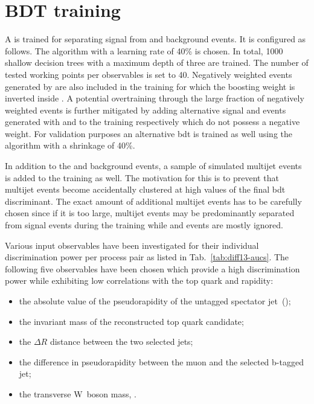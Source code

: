 \section{BDT training}
\label{sec:diff13-bdt}

A \bdt is trained for separating signal from \wjets and \ttbar background events. It is configured as follows. The \ADABOOST algorithm with a learning rate of 40\% is chosen. In total, 1000 shallow decision trees with a maximum depth of three are trained. The number of tested working points per observables is set to 40. Negatively weighted events generated by \MGAMC are also included in the training for which the boosting weight is inverted inside \TMVA. A potential overtraining through the large fraction of negatively weighted events is further mitigated by adding alternative signal and \wjets events generated with \POWHEG and \MG to the training respectively which do not possess a negative weight. For validation purposes an alternative \gls{bdt} is trained as well using the \GRADIENTBOOST algorithm with a shrinkage of 40\%.

In addition to the \wjets and \ttbar background events, a sample of simulated multijet events is added to the training as well. The motivation for this is to prevent that multijet events become accidentally clustered at high values of the final \gls{bdt} discriminant. The exact amount of additional multijet events has to be carefully chosen since if it is too large, multijet events may be predominantly separated from signal events during the training while \wjets and \ttbar events are mostly ignored.

Various input observables have been investigated for their individual discrimination power per process pair as listed in Tab.~\ref{tab:diff13-aucs}. The following five observables have been chosen which provide a high discrimination power while exhibiting low correlations with the top quark \pt and rapidity:

\begin{itemize}
\item the absolute value of the pseudorapidity of the untagged spectator jet~(\jprime);
\item the invariant mass of the reconstructed top quark candidate;
\item the $\Delta R$ distance between the two selected jets;
\item the difference in pseudorapidity between the muon and the selected b-tagged jet;
\item the transverse W~boson mass, \mtw.
\end{itemize}

